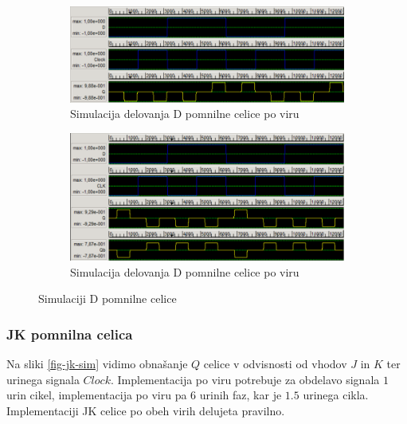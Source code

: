 \documentclass[a4paper, 11pt]{article}
\begin{document}
\begin{figure}[h!]
	\begin{subfigure}[b]{\textwidth}
	\includegraphics[width=\textwidth]{../img/vir_4/sim_d.png}
	\caption{Simulacija delovanja D pomnilne celice po viru \cite{quantum_dot}}
	\label{fig-d-1-sim}
	\end{subfigure}
	\begin{subfigure}[b]{\textwidth}
	\includegraphics[width=\textwidth]{../img/vir_5/sim_d.png}
	\caption{Simulacija delovanja D pomnilne celice po viru \cite{a_novel_approach}}
	\label{fig-d-2-sim}
	\end{subfigure}
	\caption{Simulaciji D pomnilne celice}
	\label{fig-d-sim}
\end{figure}

\subsubsection{JK pomnilna celica}
Na sliki \ref{fig-jk-sim} vidimo obnašanje $Q$ celice v odvisnosti od vhodov $J$ in $K$ ter urinega signala $Clock$.
Implementacija po viru \cite{quantum_dot} potrebuje za obdelavo signala $1$ urin cikel, implementacija po viru \cite{a_novel_approach} pa $6$ urinih faz, kar je $1.5$ urinega cikla.\\
Implementaciji JK celice po obeh virih delujeta pravilno.
\end{document}
